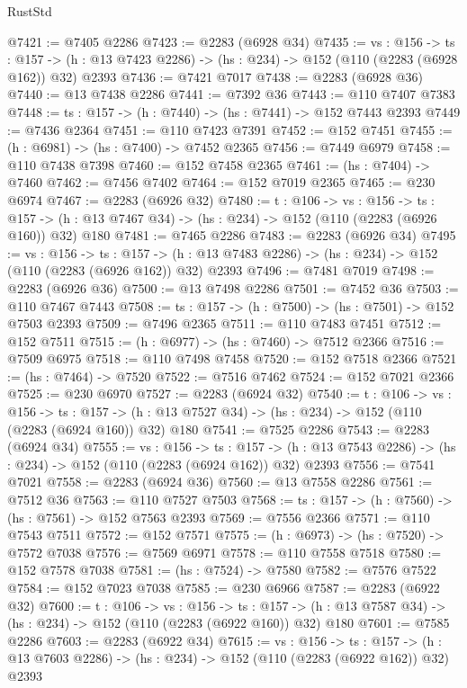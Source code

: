 \begin{lexlean}{RustStd}
\begin{coremodule}
@7421 := @7405 @2286
@7423 := @2283 (@6928 @34)
@7435 := {vs : @156} ->
  {ts : @157} -> (h : @13 @7423 @2286) -> (hs : @234) -> @152 (@110 (@2283 (@6928 @162)) @32) @2393
@7436 := @7421 @7017
@7438 := @2283 (@6928 @36)
@7440 := @13 @7438 @2286
@7441 := @7392 @36
@7443 := @110 @7407 @7383
@7448 := {ts : @157} -> (h : @7440) -> (hs : @7441) -> @152 @7443 @2393
@7449 := @7436 @2364
@7451 := @110 @7423 @7391
@7452 := @152 @7451
@7455 := (h : @6981) -> (hs : @7400) -> @7452 @2365
@7456 := @7449 @6979
@7458 := @110 @7438 @7398
@7460 := @152 @7458 @2365
@7461 := (hs : @7404) -> @7460
@7462 := @7456 @7402
@7464 := @152 @7019 @2365
@7465 := @230 @6974
@7467 := @2283 (@6926 @32)
@7480 := {t : @106} ->
  {vs : @156} ->
  {ts : @157} -> (h : @13 @7467 @34) -> (hs : @234) -> @152 (@110 (@2283 (@6926 @160)) @32) @180
@7481 := @7465 @2286
@7483 := @2283 (@6926 @34)
@7495 := {vs : @156} ->
  {ts : @157} -> (h : @13 @7483 @2286) -> (hs : @234) -> @152 (@110 (@2283 (@6926 @162)) @32) @2393
@7496 := @7481 @7019
@7498 := @2283 (@6926 @36)
@7500 := @13 @7498 @2286
@7501 := @7452 @36
@7503 := @110 @7467 @7443
@7508 := {ts : @157} -> (h : @7500) -> (hs : @7501) -> @152 @7503 @2393
@7509 := @7496 @2365
@7511 := @110 @7483 @7451
@7512 := @152 @7511
@7515 := (h : @6977) -> (hs : @7460) -> @7512 @2366
@7516 := @7509 @6975
@7518 := @110 @7498 @7458
@7520 := @152 @7518 @2366
@7521 := (hs : @7464) -> @7520
@7522 := @7516 @7462
@7524 := @152 @7021 @2366
@7525 := @230 @6970
@7527 := @2283 (@6924 @32)
@7540 := {t : @106} ->
  {vs : @156} ->
  {ts : @157} -> (h : @13 @7527 @34) -> (hs : @234) -> @152 (@110 (@2283 (@6924 @160)) @32) @180
@7541 := @7525 @2286
@7543 := @2283 (@6924 @34)
@7555 := {vs : @156} ->
  {ts : @157} -> (h : @13 @7543 @2286) -> (hs : @234) -> @152 (@110 (@2283 (@6924 @162)) @32) @2393
@7556 := @7541 @7021
@7558 := @2283 (@6924 @36)
@7560 := @13 @7558 @2286
@7561 := @7512 @36
@7563 := @110 @7527 @7503
@7568 := {ts : @157} -> (h : @7560) -> (hs : @7561) -> @152 @7563 @2393
@7569 := @7556 @2366
@7571 := @110 @7543 @7511
@7572 := @152 @7571
@7575 := (h : @6973) -> (hs : @7520) -> @7572 @7038
@7576 := @7569 @6971
@7578 := @110 @7558 @7518
@7580 := @152 @7578 @7038
@7581 := (hs : @7524) -> @7580
@7582 := @7576 @7522
@7584 := @152 @7023 @7038
@7585 := @230 @6966
@7587 := @2283 (@6922 @32)
@7600 := {t : @106} ->
  {vs : @156} ->
  {ts : @157} -> (h : @13 @7587 @34) -> (hs : @234) -> @152 (@110 (@2283 (@6922 @160)) @32) @180
@7601 := @7585 @2286
@7603 := @2283 (@6922 @34)
@7615 := {vs : @156} ->
  {ts : @157} -> (h : @13 @7603 @2286) -> (hs : @234) -> @152 (@110 (@2283 (@6922 @162)) @32) @2393

\end{coremodule}
\end{lexlean}
